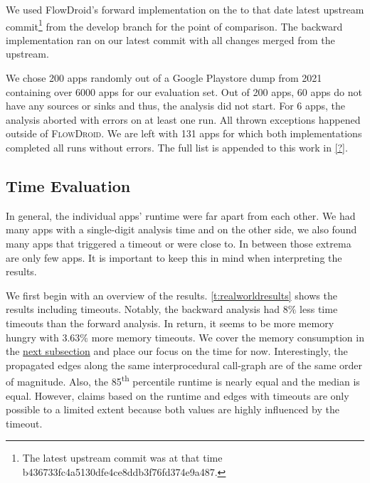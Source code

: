 \documentclass[../draft.tex]{subfiles}
\begin{document}
    We used FlowDroid's forward implementation on the to that date latest upstream commit\footnote{The latest upstream commit was at that time b436733fc4a5130dfe4ce8ddb3f76fd374e9a487.} from the develop branch for the point of comparison.
    The backward implementation ran on our latest commit with all changes merged from the upstream.

    We chose 200 apps randomly out of a Google Playstore dump from 2021 containing over 6000 apps for our evaluation set.
    Out of 200 apps, 60 apps do not have any sources or sinks and thus, the analysis did not start.
    For 6 apps, the analysis aborted with errors on at least one run. All thrown exceptions happened outside of \textsc{FlowDroid}.
    We are left with 131 apps for which both implementations completed all runs without errors.
    The full list is appended to this work in \autoref{?}.

    \FloatBarrier
    \subsection{Time Evaluation}
    In general, the individual apps' runtime were far apart from each other. 
    We had many apps with a single-digit analysis time and on the other side, we also found many apps that triggered a timeout or were close to. 
    In between those extrema are only few apps.
    It is important to keep this in mind when interpreting the results.

    We first begin with an overview of the results. 
    \autoref{t:realworldresults} shows the results including timeouts. 
    Notably, the backward analysis had $8\%$ less time timeouts than the forward analysis. 
    In return, it seems to be more memory hungry with $3.63\%$ more memory timeouts. 
    We cover the memory consumption in the \hyperref[s:memex]{next subsection} and place our focus on the time for now. 
    Interestingly, the propagated edges along the same interprocedural call-graph are of the same order of magnitude.
    Also, the 85\textsuperscript{th} percentile runtime is nearly equal and the median is equal.  
    However, claims based on the runtime and edges with timeouts are only possible to a limited extent because both values are highly influenced by the timeout.
\end{document}
